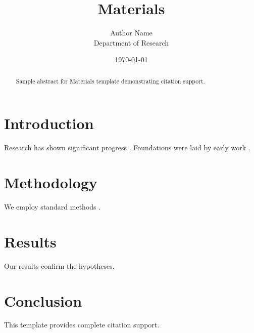 \documentclass{mdpi}
\title{Materials}
\author{Author Name \\ \small Department of Research}
\date{\today}
\begin{document}
\maketitle

\begin{abstract}
Sample abstract for Materials template demonstrating citation support.
\end{abstract}

\section{Introduction}
Research has shown significant progress \citep{einstein1905}. Foundations were laid by early work \citep{turing1950}.

\section{Methodology}
We employ standard methods \citep{knuth1984}.

\section{Results}
Our results confirm the hypotheses.

\section{Conclusion}
This template provides complete citation support.



\end{document}
